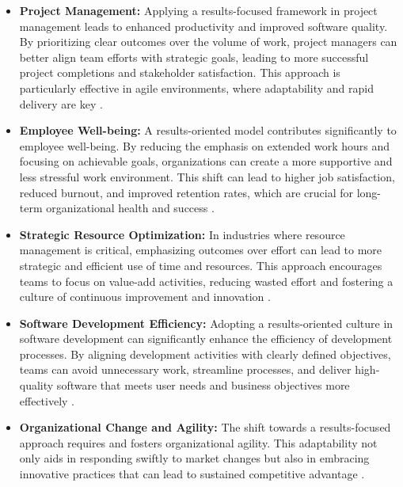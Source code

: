 \documentclass{article}
\begin{document}
\begin{itemize}
    \item \textbf{Project Management:} Applying a results-focused framework in project management leads to enhanced productivity and improved software quality. By prioritizing clear outcomes over the volume of work, project managers can better align team efforts with strategic goals, leading to more successful project completions and stakeholder satisfaction. This approach is particularly effective in agile environments, where adaptability and rapid delivery are key \cite{Tawosi2022StoryPointsEffort, Saeed2019SoftwareDevelopment}.

    \item \textbf{Employee Well-being:} A results-oriented model contributes significantly to employee well-being. By reducing the emphasis on extended work hours and focusing on achievable goals, organizations can create a more supportive and less stressful work environment. This shift can lead to higher job satisfaction, reduced burnout, and improved retention rates, which are crucial for long-term organizational health and success \cite{Mohiuddin2017LeadershipStyle, Dhas2015WorkLifeBalance}.

    \item \textbf{Strategic Resource Optimization:} In industries where resource management is critical, emphasizing outcomes over effort can lead to more strategic and efficient use of time and resources. This approach encourages teams to focus on value-add activities, reducing wasted effort and fostering a culture of continuous improvement and innovation \cite{DalMas2019OutputOutcome, FayadSchmidt1997}.

    \item \textbf{Software Development Efficiency:} Adopting a results-oriented culture in software development can significantly enhance the efficiency of development processes. By aligning development activities with clearly defined objectives, teams can avoid unnecessary work, streamline processes, and deliver high-quality software that meets user needs and business objectives more effectively \cite{WagnerDeissenboeck2019, Lowe2019SoftwareMetrics}.

    \item \textbf{Organizational Change and Agility:} The shift towards a results-focused approach requires and fosters organizational agility. This adaptability not only aids in responding swiftly to market changes but also in embracing innovative practices that can lead to sustained competitive advantage \cite{FernandesWardAraujo2022, Meckenstock2021ECIS}.
\end{itemize}
\end{document}
